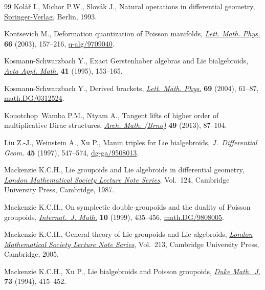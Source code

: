\begin{thebibliography}{99}
Kol{\'a}{\v{r}} I., Michor P.W., Slov{\'a}k J., Natural operations in
  dif\/ferential geometry, \href{http://dx.doi.org/10.1007/978-3-662-02950-3}{Springer-Verlag}, Berlin, 1993.

Kontsevich M., Deformation quantization of {P}oisson manifolds, \href{http://dx.doi.org/10.1023/B:MATH.0000027508.00421.bf}{\textit{Lett.
  Math. Phys.}} \textbf{66} (2003), 157--216, \mbox{\href{http://arxiv.org/abs/q-alg/9709040}{q-alg/9709040}}.

Kosmann-Schwarzbach Y., Exact {G}erstenhaber algebras and {L}ie bialgebroids,
  \href{http://dx.doi.org/10.1007/BF00996111}{\textit{Acta Appl. Math.}} \textbf{41} (1995), 153--165.

Kosmann-Schwarzbach Y., Derived brackets, \href{http://dx.doi.org/10.1007/s11005-004-0608-8}{\textit{Lett. Math. Phys.}}
  \textbf{69} (2004), 61--87, \href{http://arxiv.org/abs/math.DG/0312524}{math.DG/0312524}.

Kouotchop~Wamba P.M., Ntyam A., Tangent lifts of higher order of multiplicative
  {D}irac structures, \href{http://dx.doi.org/10.5817/AM2013-2-87}{\textit{Arch. Math. (Brno)}} \textbf{49} (2013), 87--104.

Liu Z.-J., Weinstein A., Xu P., Manin triples for {L}ie bialgebroids,
  \textit{J.~Differential Geom.} \textbf{45} (1997), 547--574,
  \href{http://arxiv.org/abs/dg-ga/9508013}{dg-ga/9508013}.

Mackenzie K.C.H., Lie groupoids and {L}ie algebroids in dif\/ferential geometry,
  \href{http://dx.doi.org/10.1017/CBO9780511661839}{\textit{London Mathematical Society Lecture Note Series}}, Vol.~124, Cambridge
  University Press, Cambridge, 1987.

Mackenzie K.C.H., On symplectic double groupoids and the duality of {P}oisson
  groupoids, \href{http://dx.doi.org/10.1142/S0129167X99000185}{\textit{Internat.~J. Math.}} \textbf{10} (1999), 435--456,
  \href{http://arxiv.org/abs/math.DG/9808005}{math.DG/9808005}.

Mackenzie K.C.H., General theory of {L}ie groupoids and {L}ie algebroids,
  \href{http://dx.doi.org/10.1017/CBO9781107325883}{\textit{London Mathematical Society Lecture Note Series}}, Vol.~213, Cambridge
  University Press, Cambridge, 2005.

Mackenzie K.C.H., Xu P., Lie bialgebroids and {P}oisson groupoids, \href{http://dx.doi.org/10.1215/S0012-7094-94-07318-3}{\textit{Duke
  Math.~J.}} \textbf{73} (1994), 415--452.


\end{thebibliography}
